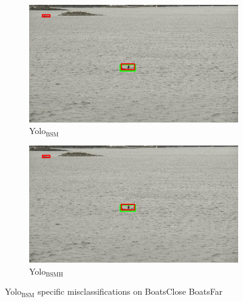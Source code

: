 \begin{figure}[h!]
\begin{subfigure}{.5\textwidth}
  \centering
  \includegraphics[width=0.9\linewidth]{results/case_buildings/yolo23/samemistake/yolo2/selected_08_07_frame13555.jpg}
  \caption{Yolo$_{\text{BSM}}$}
\end{subfigure}%
\begin{subfigure}{.5\textwidth}
  \centering
  \includegraphics[width=.9\linewidth]{results/case_buildings/yolo23/samemistake/yolo2/selected_08_07_frame13555.jpg}
  \caption{Yolo$_{\text{BSMH}}$}
\end{subfigure}
\caption{Yolo$_{\text{BSM}}$ specific misclassifications on BoatsClose BoatsFar}
\label{img:yolo2_misclas}


\end{figure}
